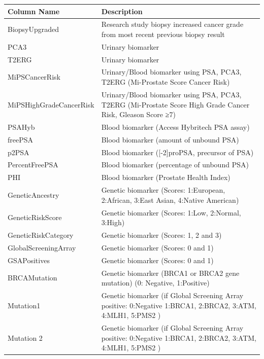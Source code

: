 \documentclass[]{article}
\begin{document}
\begin{longtable}{| p{} | p{} |} 
\hline
{\bf Column Name} & {\bf Description}  \\
\hline
BiopsyUpgraded           &    Research study biopsy increased cancer grade from most recent previous biopsy result \\
\hline
PCA3                     &    Urinary biomarker \\
\hline
T2ERG                    &    Urinary biomarker \\
\hline
MiPSCancerRisk           &    Urinary/Blood biomarker using PSA, PCA3, T2ERG (Mi-Prostate Score Cancer Risk) \\
\hline
MiPSHighGradeCancerRisk  &    Urinary/Blood biomarker using PSA, PCA3, T2ERG (Mi-Prostate Score High Grade Cancer Risk, Gleason Score ≥7) \\
\hline
PSAHyb                   &    Blood biomarker (Access Hybritech PSA assay) \\
\hline
freePSA                  &    Blood biomarker (amount of unbound PSA) \\
\hline
p2PSA                    &    Blood biomarker ([-2]proPSA, precursor of PSA) \\
\hline
PercentFreePSA           &    Blood biomarker (percentage of unbound PSA) \\
\hline
PHI                      &    Blood biomarker (Prostate Health Index) \\
\hline
GeneticAncestry          &    Genetic biomarker (Scores: 1:European, 2:African, 3:East Asian, 4:Native American) \\
\hline
GeneticRiskScore         &    Genetic biomarker (Scores: 1:Low, 2:Normal, 3:High) \\
\hline
GeneticRiskCategory      &    Genetic biomarker (Scores: 1, 2 and 3) \\
\hline
GlobalScreeningArray     &    Genetic biomarker (Scores: 0 and 1) \\
\hline
GSAPositives             &    Genetic biomarker (Scores: 0 and 1) \\
\hline
BRCAMutation             &    Genetic biomarker (BRCA1 or BRCA2 gene mutation) (0: Negative, 1:Positive) \\
\hline
Mutation1                &    Genetic biomarker (if Global Screening Array positive:  0:Negative 1:BRCA1, 2:BRCA2, 3:ATM, 4:MLH1, 5:PMS2  )  \\
\hline
Mutation 2               &    Genetic biomarker (if Global Screening Array positive:  0:Negative 1:BRCA1, 2:BRCA2, 3:ATM, 4:MLH1, 5:PMS2  )  \\

\end{longtable}
\end{document}
